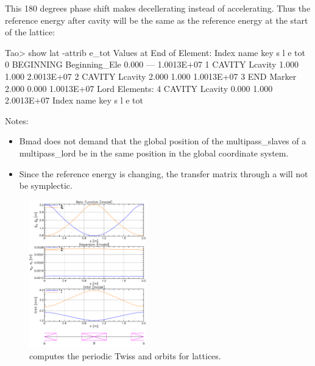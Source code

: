 \documentclass{hitec}
\begin{document}
This 180 degrees phase shift makes  decellerating instead of accelerating. Thus the
reference energy after cavity  will be the same as the reference energy at the start
of the lattice:
\begin{code}
Tao> show lat -attrib e_tot
      Values at End of Element:
 Index  name      key                      s       l           e
                                                             tot
     0  BEGINNING Beginning_Ele        0.000     ---  1.0013E+07
     1  CAVITY\1  Lcavity              1.000   1.000  2.0013E+07
     2  CAVITY\2  Lcavity              2.000   1.000  1.0013E+07
     3  END       Marker               2.000   0.000  1.0013E+07
Lord Elements:
     4  CAVITY    Lcavity              0.000   1.000  2.0013E+07
 Index  name      key                      s       l           e
                                                             tot
\end{code}

Notes:
\vspace{-5 pt}
\begin{itemize}
\item 
Bmad does not demand that the global position of the multipass_slaves of a multipass_lord be in
the same position in the global coordinate system.
\item
Since the reference energy is changing, the transfer matrix through a  will
not be symplectic.
\end{itemize}

\newpage

\begin{figure}[tb]
  \centering
  \includegraphics[width=0.45\textwidth]{geometry.pdf}
  \caption{\bmad computes the periodic Twiss and orbits for  lattices.}
  \label{f:geometry}
\end{figure}
\end{document}
